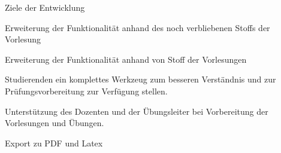 {
  \begin{itemgroup}{Ziele der Entwicklung}
    \item Erweiterung der Funktionalität anhand des noch verbliebenen
        Stoffs der Vorlesung \glqq\TPONE \grqq
    \item Erweiterung der Funktionalität anhand von Stoff der 
        Vorlesungen \glqq\TPTWO \grqq
    \item Studierenden ein komplettes Werkzeug zum besseren Verständnis und zur 
        Prüfungsvorbereitung zur Verfügung stellen.
    \item Unterstützung des Dozenten und der Übungsleiter bei Vorbereitung 
        der Vorlesungen und Übungen.
	\item Export zu PDF und Latex
  \end{itemgroup}
}



